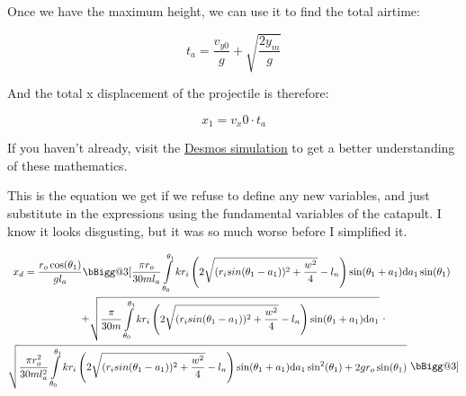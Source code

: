 \documentclass[10pt]{article}
\makeatletter
\newcommand{\vast}{\bBigg@{3}}
\makeatother
\begin{document}
\begin{flushleft}
    Once we have the maximum height, we can use it to find the total airtime:

    $$ t_a = \frac{v_{y0}}{g} + \sqrt{\frac{2y_m}{g}} $$

    And the total x displacement of the projectile is therefore:

    $$ x_1 = v_x0 \cdot t_a $$

    If you haven't already, visit the \href{https://www.desmos.com/calculator/xfx41esvkw}{\underline{Desmos simulation}} to get a better understanding of these mathematics.

    This is the equation we get if we refuse to define any new variables, and just substitute in the expressions using the fundamental variables of the catapult.
    I know it looks disgusting, but it was so much worse before I simplified it.

\end{flushleft}


  \begin{equation*}
    \begin{gathered}
      x_d = 
      \frac { r_o \cos(\theta_1) } {gl_a} 
      \vast[
        \frac{\pi r_o}{30ml_a} 
        \int\limits_{\theta_0}^{\theta_1} 
          kr_i \left( 2
            \sqrt{
              (r_i sin (\theta_1 - a_1))^2
              + \frac{w^2}{4}
            } - l_n 
          \right)
          \sin(\theta_1 + a_1) 
        \mathrm{d}a_1
        \sin(\theta_1) \
      \\
      + \begin{gathered} 
        \sqrt{ 
          \frac{\pi}{30m} 
          \int\limits_{\theta_0}^{\theta_1}
            kr_i \left( 2 
              \sqrt{
                (r_i sin (\theta_1 - a_1))^2
                + \frac{w^2}{4}
              } - l_n
            \right) 
            \sin(\theta_1 + a_1) 
          \mathrm{d}a_1 } 
      \end{gathered}
      \ \cdot
      \\
      \begin{gathered}
        \sqrt{
          \begin{gathered} 
              \frac{\pi r_o^2}{30ml_a^2} 
              \int\limits_{\theta_0}^{\theta_1}
                kr_i \left( 2 
                \sqrt{
                  (r_i sin (\theta_1 - a_1))^2
                  + \frac{w^2}{4}
                } - l_n
                \right) \sin(\theta_1 + a_1) \mathrm{d}a_1  \sin^2(\theta_1) 
          \end{gathered} 
        + 2gr_o \sin(\theta_1) } \ 
      \end{gathered} \vast]
    \end{gathered}
    \strut
  \end{equation*}
\end{document}
